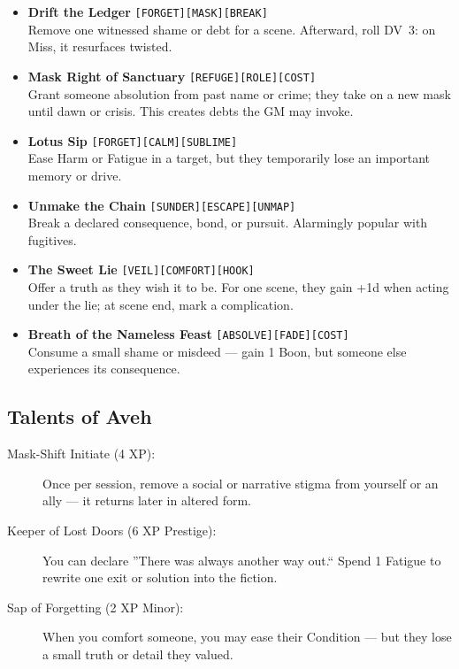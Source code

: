 \documentclass[11pt]{article}
\begin{document}
\begin{itemize}
  \item \textbf{Drift the Ledger} \;\texttt{[FORGET][MASK][BREAK]}\\
  Remove one witnessed shame or debt for a scene. Afterward, roll DV~3:
  on Miss, it resurfaces twisted.

  \item \textbf{Mask Right of Sanctuary} \;\texttt{[REFUGE][ROLE][COST]}\\
  Grant someone absolution from past name or crime; they take on a new
  mask until dawn or crisis. This creates debts the GM may invoke.

  \item \textbf{Lotus Sip} \;\texttt{[FORGET][CALM][SUBLIME]}\\
  Ease Harm or Fatigue in a target, but they temporarily lose an
  important memory or drive.

  \item \textbf{Unmake the Chain} \;\texttt{[SUNDER][ESCAPE][UNMAP]}\\
  Break a declared consequence, bond, or pursuit. Alarmingly popular
  with fugitives.

  \item \textbf{The Sweet Lie} \;\texttt{[VEIL][COMFORT][HOOK]}\\
  Offer a truth as they wish it to be. For one scene, they gain +1d when
  acting under the lie; at scene end, mark a complication.

  \item \textbf{Breath of the Nameless Feast} \;\texttt{[ABSOLVE][FADE][COST]}\\
  Consume a small shame or misdeed --- gain 1 Boon, but someone else
  experiences its consequence.
\end{itemize}

\subsection{Talents of Aveh}

\begin{description}
  \item[Mask-Shift Initiate (4 XP):]
  Once per session, remove a social or narrative stigma from yourself
  or an ally --- it returns later in altered form.

  \item[Keeper of Lost Doors (6 XP Prestige):]
  You can declare ''There was always another way out.``
  Spend 1 Fatigue to rewrite one exit or solution into the fiction.

  \item[Sap of Forgetting (2 XP Minor):]
  When you comfort someone, you may ease their Condition --- but they
  lose a small truth or detail they valued.
\end{description}
\end{document}
